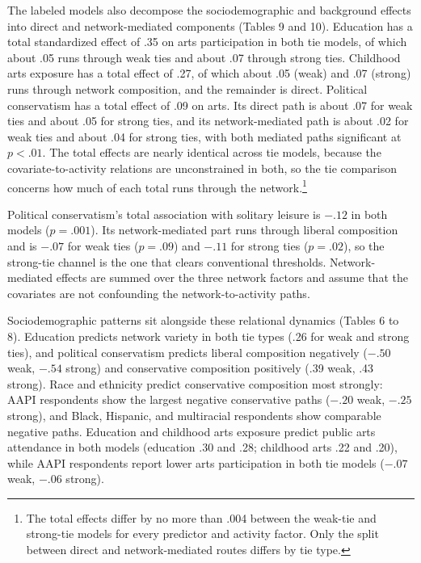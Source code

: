 \documentclass[
  12pt
]{article}
\begin{document}
The labeled models also decompose the sociodemographic and background effects into direct and network-mediated components (Tables 9 and 10). Education has a total standardized effect of .35 on arts participation in both tie models, of which about .05 runs through weak ties and about .07 through strong ties. Childhood arts exposure has a total effect of .27, of which about .05 (weak) and .07 (strong) runs through network composition, and the remainder is direct. Political conservatism has a total effect of .09 on arts. Its direct path is about .07 for weak ties and about .05 for strong ties, and its network-mediated path is about .02 for weak ties and about .04 for strong ties, with both mediated paths significant at $p < .01$. The total effects are nearly identical across tie models, because the covariate-to-activity relations are unconstrained in both, so the tie comparison concerns how much of each total runs through the network.\footnote{The total effects differ by no more than .004 between the weak-tie and strong-tie models for every predictor and activity factor. Only the split between direct and network-mediated routes differs by tie type.}

Political conservatism's total association with solitary leisure is $-.12$ in both models ($p = .001$). Its network-mediated part runs through liberal composition and is $-.07$ for weak ties ($p = .09$) and $-.11$ for strong ties ($p = .02$), so the strong-tie channel is the one that clears conventional thresholds. Network-mediated effects are summed over the three network factors and assume that the covariates are not confounding the network-to-activity paths.

Sociodemographic patterns sit alongside these relational dynamics (Tables 6 to 8). Education predicts network variety in both tie types (.26 for weak and strong ties), and political conservatism predicts liberal composition negatively ($-.50$ weak, $-.54$ strong) and conservative composition positively (.39 weak, .43 strong). Race and ethnicity predict conservative composition most strongly: AAPI respondents show the largest negative conservative paths ($-.20$ weak, $-.25$ strong), and Black, Hispanic, and multiracial respondents show comparable negative paths. Education and childhood arts exposure predict public arts attendance in both models (education .30 and .28; childhood arts .22 and .20), while AAPI respondents report lower arts participation in both tie models ($-.07$ weak, $-.06$ strong).
\end{document}
